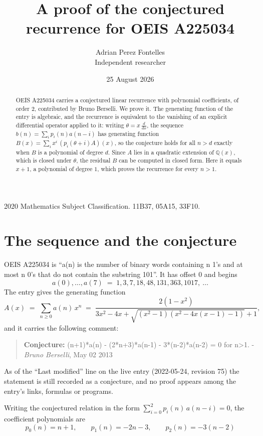 \documentclass[11pt,a4paper]{article}
\title{A proof of the conjectured recurrence for OEIS A225034}
\author{Adrian Perez Fontelles\\ \small Independent researcher}
\date{25 August 2026}
\theoremstyle{plain}
\theoremstyle{definition}
\begin{document}
\maketitle

\begin{abstract}
OEIS A225034 carries a conjectured linear recurrence with polynomial coefficients, of
order 2, contributed by Bruno Berselli. We prove it. The generating function of the
entry is algebraic, and the recurrence is equivalent to the vanishing of an explicit
differential operator applied to it: writing $\theta=x\,\frac{d}{dx}$, the sequence
$b(n)=\sum_{i}p_{i}(n)a(n-i)$ has generating function
$B(x)=\sum_{i}x^{i}\,(p_{i}(\theta+i)A)(x)$, so the conjecture holds for all $n>d$ exactly
when $B$ is a polynomial of degree $d$. Since $A$ lies in a quadratic extension of
$\mathbb{Q}(x)$, which is closed under $\theta$, the residual $B$ can be computed in
closed form. Here it equals $x + 1$, a polynomial of degree $1$, which proves
the recurrence for every $n>1$.
\end{abstract}

\noindent\small 2020 Mathematics Subject Classification. 11B37, 05A15, 33F10.\normalsize

\section{The sequence and the conjecture}

OEIS A225034 is ``a(n) is the number of binary words containing n 1's and at most n 0's that do not contain the substring 101''. It has offset $0$ and begins
\[
a(0),\dots,a(7)\;=\;1, 3, 7, 18, 48, 131, 363, 1017,\ \dots
\]
The entry gives the generating function
\begin{equation}\label{eq:gf}
A(x)\;=\;\sum_{n\ge 0} a(n)\,x^{n}\;=\;\frac{2 \left(1 - x^{2}\right)}{3 x^{2} - 4 x + \sqrt{\left(x^{2} - 1\right) \left(x^{2} - 4 x \left(x - 1\right) - 1\right)} + 1} ,
\end{equation}
and it carries the following comment:
\begin{quote}\small
\textbf{Conjecture:} (n+1)*a(n) - (2*n+3)*a(n-1) - 3*(n-2)*a(n-2) = 0 for n>1. - \emph{Bruno Berselli}, May 02 2013
\end{quote}
As of the ``Last modified'' line on the live entry (2022-05-24, revision 75) the
statement is still recorded as a conjecture, and no proof appears among the entry's links,
formulas or programs.

Writing the conjectured relation in the form $\sum_{i=0}^{2}p_{i}(n)\,a(n-i)=0$,
the coefficient polynomials are
\[
p_{0}(n)=n + 1,\qquad p_{1}(n)=- 2 n - 3,\qquad p_{2}(n)=- 3 \left(n - 2\right)
\]
\end{document}
